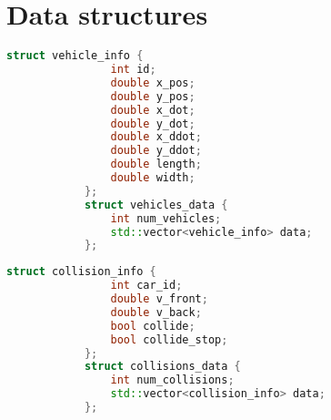 \chapter{Data structures}
\label{app:code}
    \begin{lstlisting}[language=C++, caption={Vehicle data structure}, label={lst:vehicle_data}]
            struct vehicle_info {
                int id;
                double x_pos;
                double y_pos;
                double x_dot;
                double y_dot;
                double x_ddot;
                double y_ddot;
                double length;
                double width;
            };
            struct vehicles_data {
                int num_vehicles;
                std::vector<vehicle_info> data;
            };
        \end{lstlisting}

        \begin{lstlisting}[language=C++, caption={Collision data structure}, label={lst:collision_data}]
            struct collision_info {
                int car_id;
                double v_front;
                double v_back;
                bool collide;
                bool collide_stop;
            };
            struct collisions_data {
                int num_collisions;
                std::vector<collision_info> data;
            };
        \end{lstlisting}